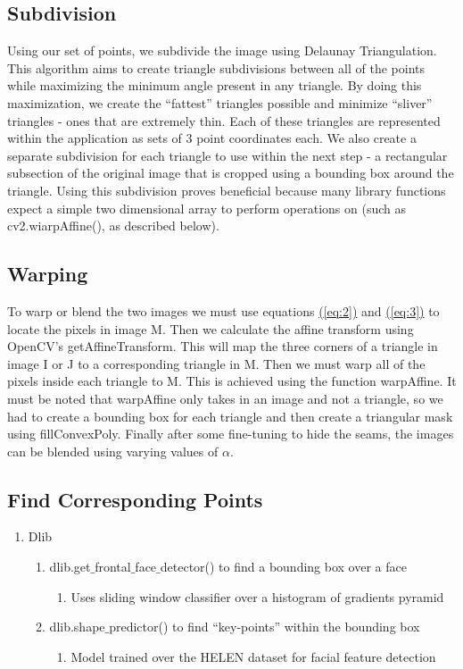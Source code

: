\documentclass[journal]{IEEEtran}
\begin{document}
\subsection{Subdivision}
Using our set of points, we subdivide the image using Delaunay Triangulation. This algorithm aims to create triangle subdivisions between all of the points while maximizing the minimum angle present in any triangle. By doing this maximization, we create the “fattest” triangles possible and minimize “sliver” triangles - ones that are extremely thin. Each of these triangles are represented within the application as sets of 3 point coordinates each. 
We also create a separate subdivision for each triangle to use within the next step - a rectangular subsection of the original image that is cropped using a bounding box around the triangle. Using this subdivision proves beneficial because many library functions expect a simple two dimensional array to perform operations on (such as cv2.wiarpAffine(), as described below).

\subsection{Warping}
To warp or blend the two images we must use equations \hyperref[eq:2]{(\ref{eq:2})} and \hyperref[eq:3]{(\ref{eq:3})} to locate the pixels in image M. Then we calculate the affine transform using OpenCV’s getAffineTransform. This will map the three corners of a triangle in image I or J to a corresponding triangle in M. Then we must warp all of the pixels inside each triangle to M. This is achieved using the function warpAffine. It must be noted that warpAffine only takes in an image and not a triangle, so we had to create a bounding box for each triangle and then create a triangular mask using fillConvexPoly.
Finally after some fine-tuning to hide the seams, the images can be blended using varying values of $\alpha$.

\subsection{Find Corresponding Points}
\begin{enumerate}[label=\alph*)]
\item Dlib
\begin{enumerate}[label=\roman*)]
	\item dlib.get$\_$frontal$\_$face$\_$detector() to find a bounding box over a face
	\begin{enumerate}[label=\arabic*)]
		\item Uses sliding window classifier over a histogram of gradients pyramid
	\end{enumerate}
	\item dlib.shape$\_$predictor() to find “key-points” within the bounding box
	\begin{enumerate}[label=\arabic*)]
		\item Model trained over the HELEN dataset for facial feature detection
	\end{enumerate}
\end{enumerate}
\end{enumerate}
\end{document}
